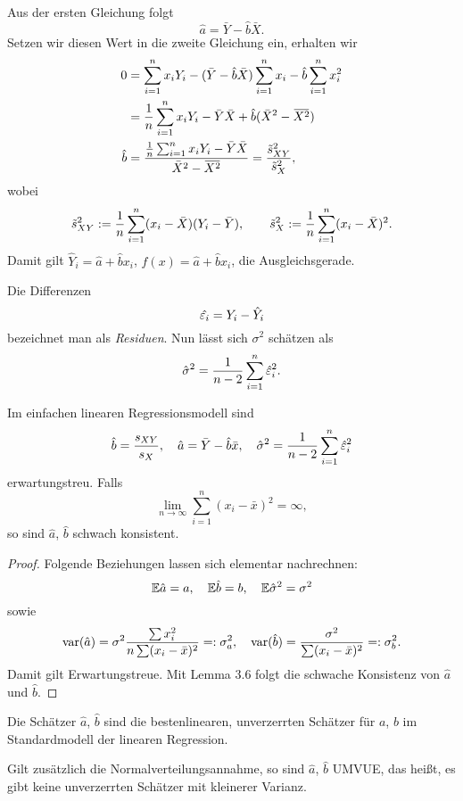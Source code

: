 \documentclass[
 a4paper,
 12pt,
 parskip=half
 ]{scrreprt}
\theoremstyle{plain}
\theoremstyle{definition}
\numberwithin{equation}{chapter}
\begin{document}
Aus der ersten Gleichung folgt
\[ \hat{a} = \bar{Y} - \hat{b} \bar{X}. \]
Setzen wir diesen Wert in die zweite Gleichung ein, erhalten wir
\begin{align*}
 0 &= \sum_{i=1}^n x_i Y_i - (\bar{Y} - \hat{b} \bar{X}) \sum_{i=1}^n x_i -
     \hat{b} \sum_{i=1}^n x_i^2 \\
   &= \rez{n} \sum_{i=1}^n x_i Y_i
     - \bar{Y} \bar{X} + \hat{b} (\bar{X}^2 - \obar{X^2}) \\
  \hat{b} &= \frac{\rez{n} \sum_{i=1}^n x_i Y_i - \bar{Y} \bar{X}}
            {\bar{X}^2 - \obar{X^2}}
            = \frac{\tilde{s}^2_{XY}}{\tilde{s}^2_X},
\end{align*}
wobei
\[ \tilde{s}^2_{XY}
  := \frac{1}{n} \sum_{i=1}^n (x_i - \bar{X})(Y_i - \bar{Y}),  \qquad
  \tilde{s}^2_X := \frac{1}{n} \sum_{i=1}^n (x_i - \bar{X})^2. \]
Damit gilt $\hat{Y}_i = \hat{a} + \hat{b} x_i$, $f(x) = \hat{a} + \hat{b} x_i$,
die Ausgleichsgerade.

Die Differenzen
\[ \hat{\varepsilon_i} = Y_i - \hat{Y}_i \]
bezeichnet man als \emph{Residuen}. Nun lässt sich $\sigma^2$ schätzen als
\[ \hat{\sigma}^2 = \frac{1}{n-2} \sum_{i=1}^n \hat{\varepsilon}_i^2. \]

\begin{prp}
  Im einfachen linearen Regressionsmodell sind
  \[ \hat{b} = \frac{{s_{XY}}}{s_X}, \quad \hat{a} = \bar{Y} - \hat{b} \bar{x},
    \quad \hat{\sigma}^2 = \frac{1}{n-2} \sum_{i=1}^n \hat{\varepsilon}_i^2 \]
  erwartungstreu. Falls
  \begin{equation}
    \lim_{n \to \infty} \sum_{i=1}^n (x_i - \bar{x})^2 = \infty,
  \end{equation}
  so sind $\hat{a}$, $\hat{b}$ schwach konsistent.
\end{prp}

\begin{proof}
  Folgende Beziehungen lassen sich elementar nachrechnen:
  \[ \mathbb{E} \hat{a} = a, \quad \mathbb{E} \hat{b} = b, \quad \mathbb{E} \hat{\sigma}^2 =
    \sigma^2 \]
  sowie
  \begin{equation}
  \operatorname{var}(\hat{a}) = \sigma^2 \frac{\sum x_i^2}{n \sum(x_i - \bar{x})^2} =:
    \sigma_a^2, \quad
    \operatorname{var}(\hat{b}) = \frac{\sigma^2}{\sum(x_i - \bar{x})^2} =: \sigma_b^2.
  \end{equation}
  Damit gilt Erwartungstreue. Mit Lemma 3.6 folgt die schwache Konsistenz von
  $\hat{a}$ und $\hat{b}$.
\end{proof}

\begin{thm}
  Die Schätzer $\hat{a}$, $\hat{b}$ sind die besten\footnotemark linearen,
  unverzerrten Schätzer für $a$, $b$ im Standardmodell der linearen Regression.

  Gilt zusätzlich die Normalverteilungsannahme, so sind $\hat{a}$, $\hat{b}$
  UMVUE, das heißt, es gibt keine unverzerrten Schätzer mit kleinerer Varianz.
\end{thm}
\end{document}
